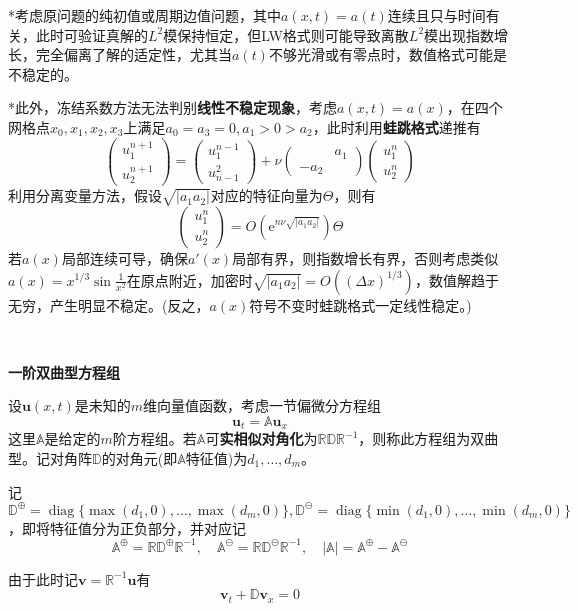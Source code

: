 \documentclass[a4paper,UTF8,fontset=windows]{ctexart}
\newcommand*{\bu}{\mathbf{u}}
\DeclareMathOperator{\diag}{diag}
\begin{document}
*考虑原问题的纯初值或周期边值问题，其中$a(x,t)=a(t)$连续且只与时间有关，此时可验证真解的$L^2$模保持恒定，但LW格式则可能导致离散$L^2$模出现指数增长，完全偏离了解的适定性，尤其当$a(t)$不够光滑或有零点时，数值格式可能是不稳定的。

*此外，冻结系数方法无法判别\textbf{线性不稳定现象}，考虑$a(x,t)=a(x)$，在四个网格点$x_0,x_1,x_2,x_3$上满足$a_0=a_3=0,a_1>0>a_2$，此时利用\textbf{蛙跳格式}递推有
$$\begin{pmatrix}u_1^{n+1}\\u_2^{n+1}\end{pmatrix}=\begin{pmatrix}u_1^{n-1}\\u^2_{n-1}\end{pmatrix}+\nu\begin{pmatrix}&a_1\\-a_2&\end{pmatrix}\begin{pmatrix}u_1^n\\u_2^n\end{pmatrix}$$
利用分离变量方法，假设$\sqrt{|a_1a_2|}$对应的特征向量为$\Theta$，则有
$$\begin{pmatrix}u_1^n\\u_2^n\end{pmatrix}=O(\mathrm{e}^{n\nu\sqrt{|a_1a_2|}})\Theta$$
若$a(x)$局部连续可导，确保$a'(x)$局部有界，则指数增长有界，否则考虑类似$a(x)=x^{1/3}\sin\frac{1}{x^2}$在原点附近，加密时$\sqrt{|a_1a_2|}=O((\Delta x)^{1/3})$，数值解趋于无穷，产生明显不稳定。(反之，$a(x)$符号不变时蛙跳格式一定线性稳定。)

\

\textbf{一阶双曲型方程组}

设$\bu(x,t)$是未知的$m$维向量值函数，考虑一节偏微分方程组
$$\bu_t=\mathbb{A}\bu_x$$
这里$\mathbb{A}$是给定的$m$阶方程组。若$\mathbb{A}$可\textbf{实相似对角化}为$\mathbb{R}\mathbb{D}\mathbb{R}^{-1}$，则称此方程组为双曲型。记对角阵$\mathbb{D}$的对角元(即$\mathbb{A}$特征值)为$d_1,\dots,d_m$。

记$\mathbb{D}^\oplus=\diag\{\max(d_1,0),\dots,\max(d_m,0)\},\mathbb{D}^{\ominus}=\diag\{\min(d_1,0),\dots,\min(d_m,0)\}$，即将特征值分为正负部分，并对应记
$$\mathbb{A}^\oplus=\mathbb{R}\mathbb{D}^\oplus\mathbb{R}^{-1},\quad\mathbb{A}^\ominus=\mathbb{R}\mathbb{D}^\ominus\mathbb{R}^{-1},\quad|\mathbb{A}|=\mathbb{A}^\oplus-\mathbb{A}^\ominus$$

由于此时记$\mathbf{v}=\mathbb{R}^{-1}\bu$有
$$\mathbf{v}_t+\mathbb{D}\mathbf{v}_x=0$$
\end{document}
